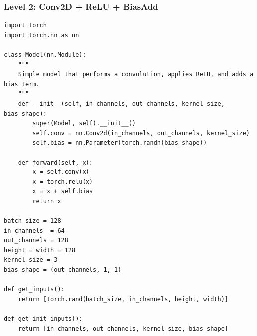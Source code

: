 \subsubsection{Level 2: Conv2D + ReLU + BiasAdd}
\begin{mdframed}[linewidth=1pt, linecolor=black, backgroundcolor=gray!5]
\begin{lstlisting}
import torch
import torch.nn as nn

class Model(nn.Module):
    """
    Simple model that performs a convolution, applies ReLU, and adds a bias term.
    """
    def __init__(self, in_channels, out_channels, kernel_size, bias_shape):
        super(Model, self).__init__()
        self.conv = nn.Conv2d(in_channels, out_channels, kernel_size)
        self.bias = nn.Parameter(torch.randn(bias_shape)) 

    def forward(self, x):
        x = self.conv(x)
        x = torch.relu(x)
        x = x + self.bias
        return x

batch_size = 128
in_channels  = 64  
out_channels = 128  
height = width = 128
kernel_size = 3
bias_shape = (out_channels, 1, 1)

def get_inputs():
    return [torch.rand(batch_size, in_channels, height, width)]

def get_init_inputs():
    return [in_channels, out_channels, kernel_size, bias_shape]
\end{lstlisting}
\end{mdframed}

